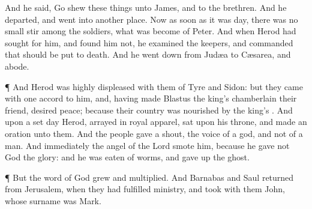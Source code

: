 {And he
said, Go
shew these
things unto
James,
and to the
brethren.
And he
departed, and
went
into
another
place.
Now as soon as it
was
day, there
was
no
small
stir
among the
soldiers,
what was
become of
Peter.
And when
Herod had
sought for
him,
and found
him
not, he
examined the
keepers, and commanded
that
{} should be put to
death.
And he went
down
from
Judæa
to
Cæsarea,
and
{}
abode.
\par }{\PP {}¶
And
Herod
was highly
displeased with them of
Tyre
and
Sidon:
but they
came with one
accord
to
him,
and, having
made
Blastus the
king’s
chamberlain their
friend,
desired
peace;
because
their
country was
nourished
by the
king’s
{}.
And upon a
set
day
Herod, arrayed
in
royal
apparel,
sat
upon his
throne, and made an
oration
unto
them.
And the
people gave a
shout,
{} the
voice of a
god,
and
not of a
man.
And
immediately the
angel of the
Lord
smote
him,
because he
gave
not
God the
glory:
and he
was eaten of
worms, and gave up the
ghost.
\par }{\PP {}¶
But the
word of
God
grew
and
multiplied.
And
Barnabas
and
Saul
returned
from
Jerusalem, when they had
fulfilled
{}
ministry,
and took with
them
John, whose surname
was
Mark.

}
